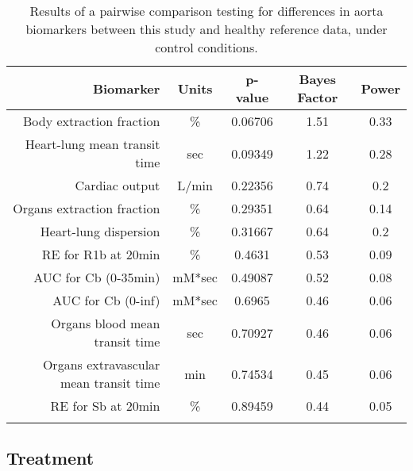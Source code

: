 \documentclass{epflreport}%
\begin{document}
\begin{longtable}{rcccc}%
\hline%
Biomarker&Units&p{-}value&Bayes Factor&Power\\%
\hline%
Body extraction fraction&\%&0.06706&1.51&0.33\\%
Heart{-}lung mean transit time&sec&0.09349&1.22&0.28\\%
Cardiac output&L/min&0.22356&0.74&0.2\\%
Organs extraction fraction&\%&0.29351&0.64&0.14\\%
Heart{-}lung dispersion&\%&0.31667&0.64&0.2\\%
RE for R1b at 20min&\%&0.4631&0.53&0.09\\%
AUC for Cb (0{-}35min)&mM*sec&0.49087&0.52&0.08\\%
AUC for Cb (0{-}inf)&mM*sec&0.6965&0.46&0.06\\%
Organs blood mean transit time&sec&0.70927&0.46&0.06\\%
Organs extravascular mean transit time&min&0.74534&0.45&0.06\\%
RE for Sb at 20min&\%&0.89459&0.44&0.05\\%
\hline%
\caption{Results of a pairwise comparison testing for differences in aorta biomarkers between this study and healthy reference data, under control conditions.} \\%
\end{longtable}%
\clearpage%
\subsection{Treatment}%
\label{subsec:Treatment}%
\end{document}
